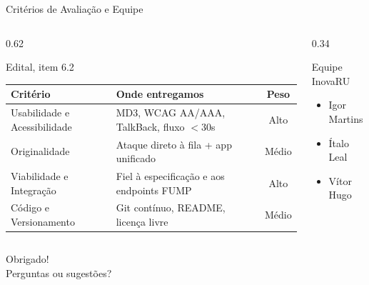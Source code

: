 \documentclass[10pt, aspectratio=169]{beamer}
\begin{document}
\begin{frame}{Critérios de Avaliação e Equipe}
    \begin{columns}[T]
        \begin{column}{0.62\textwidth}
            \begin{block}{Edital, item 6.2}
                \scriptsize
                \begin{tabular}{@{}p{3.1cm}p{5.3cm}c@{}}
                    \toprule
                    \textbf{Critério} & \textbf{Onde entregamos} & \textbf{Peso} \\
                    \midrule
                    Usabilidade e Acessibilidade & MD3, WCAG AA/AAA, TalkBack, fluxo $<$30s & Alto \\
                    Originalidade & Ataque direto à fila + app unificado & Médio \\
                    Viabilidade e Integração & Fiel à especificação e aos endpoints FUMP & Alto \\
                    Código e Versionamento & Git contínuo, README, licença livre & Médio \\
                    \bottomrule
                \end{tabular}
            \end{block}
        \end{column}
        \begin{column}{0.34\textwidth}
            \begin{alertblock}{Equipe InovaRU}
                \small
                \begin{itemize}
                    \item Igor Martins
                    \item Ítalo Leal
                    \item Vítor Hugo
                \end{itemize}
            \end{alertblock}
        \end{column}
    \end{columns}
\end{frame}

\begin{frame}[standout]
    Obrigado!\\
    \Large Perguntas ou sugestões?
\end{frame}
\end{document}
